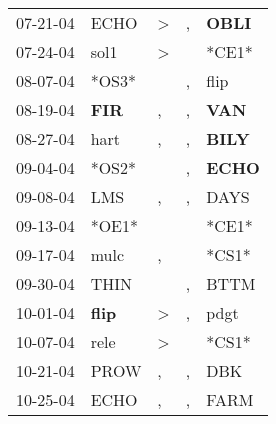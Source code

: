 \begin{supertabular}{p{0.07\textwidth}p{0.06\textwidth}p{0.02\textwidth}p{0.02\textwidth}p{0.06\textwidth}}
          07-21-04\textsuperscript{} &           ECHO\textsuperscript{} &     \textgreater &                , &  \textbf{OBLI\textsuperscript{}} \\
          07-24-04\textsuperscript{} &           sol1\textsuperscript{} &     \textgreater &                  &                            *CE1* \\
          08-07-04\textsuperscript{} &                            *OS3* &                  &                , &           flip\textsuperscript{} \\
          08-19-04\textsuperscript{} &   \textbf{FIR\textsuperscript{}} &                , &                , &   \textbf{VAN\textsuperscript{}} \\
          08-27-04\textsuperscript{} &           hart\textsuperscript{} &                , &                , &  \textbf{BILY\textsuperscript{}} \\
          09-04-04\textsuperscript{} &                            *OS2* &                  &                , &  \textbf{ECHO\textsuperscript{}} \\
          09-08-04\textsuperscript{} &            LMS\textsuperscript{} &                , &                , &           DAYS\textsuperscript{} \\
          09-13-04\textsuperscript{} &                            *OE1* &                  &                  &                            *CE1* \\
          09-17-04\textsuperscript{} &           mulc\textsuperscript{} &                , &                  &                            *CS1* \\
          09-30-04\textsuperscript{} &           THIN\textsuperscript{} &                  &                , &           BTTM\textsuperscript{} \\
          10-01-04\textsuperscript{} &  \textbf{flip\textsuperscript{}} &     \textgreater &                , &           pdgt\textsuperscript{} \\
          10-07-04\textsuperscript{} &           rele\textsuperscript{} &     \textgreater &                  &                            *CS1* \\
          10-21-04\textsuperscript{} &           PROW\textsuperscript{} &                , &                , &            DBK\textsuperscript{} \\
          10-25-04\textsuperscript{} &           ECHO\textsuperscript{} &                , &                , &           FARM\textsuperscript{} \\

\end{supertabular}

